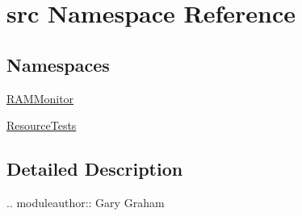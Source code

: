 \hypertarget{namespacesrc}{\section{src Namespace Reference}
\label{namespacesrc}
}
\subsection*{Namespaces}
\begin{DoxyCompactItemize}
\item 
\hyperlink{namespacesrc_1_1_r_a_m_monitor}{R\-A\-M\-Monitor}
\item 
\hyperlink{namespacesrc_1_1_resource_tests}{Resource\-Tests}
\end{DoxyCompactItemize}


\subsection{Detailed Description}
\begin{DoxyVerb}.. moduleauthor:: Gary Graham
\end{DoxyVerb}
 